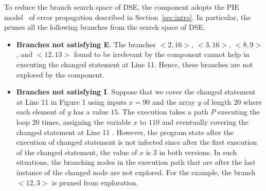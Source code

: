 To reduce the branch search space of DSE, the  component adopts the PIE model~\cite{voas} of error propagation described in Section~\ref{sec:intro}. In particular, the  prunes all the following branches from the search space of DSE.
\begin{itemize}
	\item \textbf{Branches not satisfying E}. The branches $<2, 16>$, $<3, 16>$, $<8, 9>$, and $<12, 13>$ found to be irrelevant by the  component cannot help in executing the changed statement at Line 11. Hence, these branches are not explored by the  component. 
	\item \textbf{Branches not satisfying I}. Suppose
that we cover the changed statement at Line 11 in Figure 1 using inputs
$x=90$ and the array $y$ of length $20$ where each element of $y$
has a value $15$. The execution takes a path $P$ executing the
loop $20$ times, assigning the variable $x$ to $110$ and eventually
covering the changed statement at Line 11 . However, the program state after the
execution of  changed statement is not infected since after the first execution
of the changed statement, the value of $x$ is $3$ in both versions. In such situations, the branching nodes in the execution path
that are after the last instance of the changed node are not explored. For the example, the branch $<12, 3>$ is pruned from exploration.
\end{itemize}






